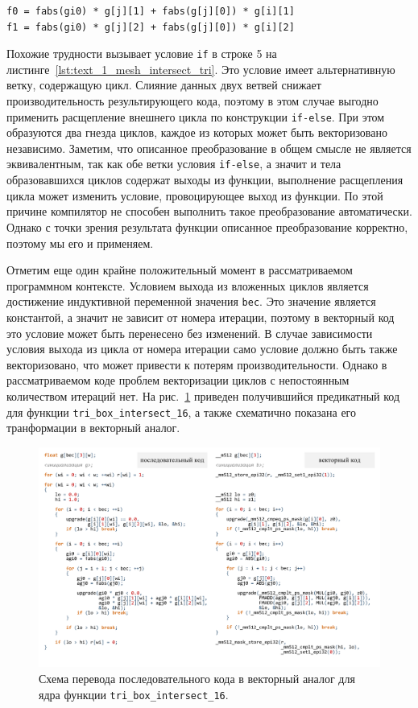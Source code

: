 \begin{lstlisting}[caption={Использование тождества для векторизации условия.},label={lst:text_4_mesh_intersect_tozh}]
f0 = fabs(gi0) * g[j][1] + fabs(g[j][0]) * g[i][1]
f1 = fabs(gi0) * g[j][2] + fabs(g[j][0]) * g[i][2]
\end{lstlisting}

Похожие трудности вызывает условие \texttt{if} в строке 5 на листинге~\ref{lst:text_1_mesh_intersect_tri}.
Это условие имеет альтернативную ветку, содержащую цикл.
Слияние данных двух ветвей снижает производительность результирующего кода, поэтому в этом случае выгодно применить расщепление внешнего цикла по конструкции \texttt{if-else}.
При этом образуются два гнезда циклов, каждое из которых может быть векторизовано независимо.
Заметим, что описанное преобразование в общем смысле не является эквивалентным, так как обе ветки условия \texttt{if-else}, а значит и тела образовавшихся циклов содержат выходы из функции, выполнение расщепления цикла может изменить условие, провоцирующее выход из функции.
По этой причине компилятор не способен выполнить такое преобразование автоматически.
Однако с точки зрения результата функции описанное преобразование корректно, поэтому мы его и применяем.

Отметим еще один крайне положительный момент в рассматриваемом программном контексте.
Условием выхода из вложенных циклов является достижение индуктивной переменной значения \texttt{bec}.
Это значение является константой, а значит не зависит от номера итерации, поэтому в векторный код это условие может быть перенесено без изменений.
В случае зависимости условия выхода из цикла от номера итерации само условие должно быть также векторизовано, что может привести к потерям производительности.
Однако в рассматриваемом коде проблем векторизации циклов с непостоянным количеством итераций нет.
На рис.~\ref{fig:text_1_mesh_intersect_scheme} приведен получившийся предикатный код для функции \texttt{tri\_box\_intersect\_16}, а также схематично показана его транформации в векторный аналог.

\begin{figure}[ht]
\centering
\includegraphics[width=1.0\textwidth]{./pics/text_4_mesh_intersect/final_scheme.pdf}
\singlespacing
{}\caption{Схема перевода последовательного кода в векторный аналог для ядра функции \texttt{tri\_box\_intersect\_16}.}
\label{fig:text_1_mesh_intersect_scheme}
\end{figure}

